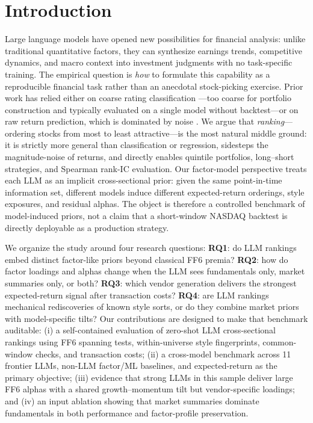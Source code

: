 \section{Introduction}

Large language models have opened new possibilities for financial analysis: unlike traditional quantitative factors, they can synthesize earnings trends, competitive dynamics, and macro context into investment judgments with no task-specific training.
The empirical question is \emph{how} to formulate this capability as a reproducible financial task rather than an anecdotal stock-picking exercise.
Prior work has relied either on coarse rating classification \citep{papasotiriou2024ai}---too coarse for portfolio construction and typically evaluated on a single model without backtest---or on raw return prediction, which is dominated by noise \citep{gu2020empirical}.
We argue that \emph{ranking}---ordering stocks from most to least attractive---is the most natural middle ground: it is strictly more general than classification or regression, sidesteps the magnitude-noise of returns, and directly enables quintile portfolios, long--short strategies, and Spearman rank-IC evaluation.
Our factor-model perspective treats each LLM as an implicit cross-sectional prior: given the same point-in-time information set, different models induce different expected-return orderings, style exposures, and residual alphas.
The object is therefore a controlled benchmark of model-induced priors, not a claim that a short-window NASDAQ backtest is directly deployable as a production strategy.

We organize the study around four research questions:
\textbf{RQ1}: do LLM rankings embed distinct factor-like priors beyond classical FF6 premia?
\textbf{RQ2}: how do factor loadings and alphas change when the LLM sees fundamentals only, market summaries only, or both?
\textbf{RQ3}: which vendor generation delivers the strongest expected-return signal after transaction costs?
\textbf{RQ4}: are LLM rankings mechanical rediscoveries of known style sorts, or do they combine market priors with model-specific tilts?
Our contributions are designed to make that benchmark auditable:
(i) a self-contained evaluation of zero-shot LLM cross-sectional rankings using FF6 spanning tests, within-universe style fingerprints, common-window checks, and transaction costs;
(ii) a cross-model benchmark across 11 frontier LLMs, non-LLM factor/ML baselines, and expected-return as the primary objective;
(iii) evidence that strong LLMs in this sample deliver large FF6 alphas with a shared growth--momentum tilt but vendor-specific loadings; and
(iv) an input ablation showing that market summaries dominate fundamentals in both performance and factor-profile preservation.

